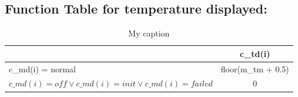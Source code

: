 \documentclass[fontsize=12pt,paper=letter,twoside]{scrartcl}
\begin{document}
\subsection{Function Table for temperature displayed:  }
\begin{table}[h]
\centering
\begin{tabular}{l|c|}
\cline{2-2}
                                                                           & c\_td(i)           \\ \hline
\multicolumn{1}{|l|}{c\_md(i) = normal}                                    & floor(m\_tm + 0.5) \\ \hline
\multicolumn{1}{|l|}{$c\_md(i) = off \vee c\_md(i) = init \vee c\_md(i) = failed$} & 0                  \\ \hline
\end{tabular}
\caption{My caption}
\label{my-label}
\end{table}
\end{document}
